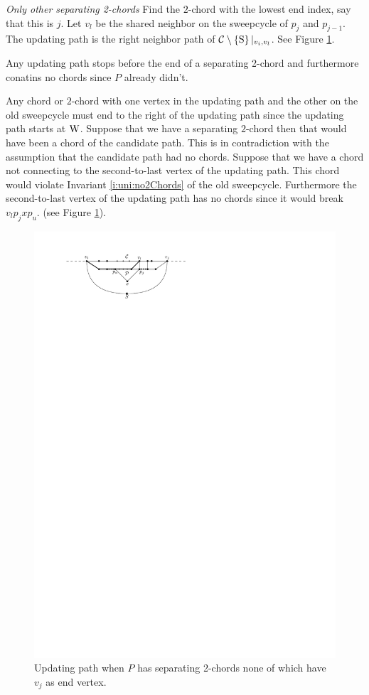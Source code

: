     \emph{Only other separating 2-chords}
      Find the $2$-chord with the lowest end index, say that this is $j$.
      Let $v_l$ be the shared neighbor on the sweepcycle of $p_{j}$ and $p_{j-1}$.
      The updating path is the right neighbor path of $\mathcal{C} \setminus \left\lbrace {\mathrm{S}} \right\rbrace|_{v_i, v_l}$. See Figure \ref{fig:sweep:free2chord}.

      Any updating path stops before the end of a separating 2-chord and furthermore conatins no chords since $P$ already didn't.

      Any chord or $2$-chord with one vertex in the updating path and the other on the old sweepcycle must end to the right of the updating path since the updating path starts at $\mathrm{W}$.
      Suppose that we have a separating $2$-chord then that would have been a chord of the candidate path. This is in contradiction with the assumption that the candidate path had no chords.
      Suppose that we have a chord not connecting to the second-to-last vertex of the updating path. This chord would violate Invariant \ref{i:uni:no2Chords} of the old sweepcycle. Furthermore the second-to-last vertex of the updating path has no chords since it would break $v_l p_j x p_u$. (see Figure \ref{fig:sweep:free2chord}).

    \begin{figure}[b]
      \centering
      \includegraphics[scale=1]{unifiedAlgo/img/sweep/free2chord}
      \caption{Updating path when $P$ has separating 2-chords none of which have $v_j$ as end vertex.}
      \label{fig:sweep:free2chord}
    \end{figure}

